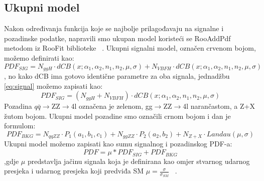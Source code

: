 \documentclass[12pt,a4paper,oneside]{article}
\begin{document}
\begin{linenumbers}
		\subsection{Ukupni model}
		Nakon određivanja funkcija koje se najbolje prilagođavaju na signalne i pozadinske podatke, napravili smo ukupan model koristeći se RooAddPdf metodom iz RooFit biblioteke ~\cite{rooaddpdf}. 
		Ukupni signalni model, označen crvenom bojom, možemo definirati kao:
		\begin{equation}\label{eq:signal}
		PDF_{SIG}=N_{ggH} \cdot dCB(x;\alpha_{1}, \alpha_{2}, n_{1}, n_{2}, \mu, \sigma) + N_{VBFH} \cdot dCB(x;\alpha_{1}, \alpha_{2}, n_{1}, n_{2}, \mu, \sigma)
		\end{equation}
		, no kako dCB ima gotovo identične parametre za oba signala, jednadžbu \ref{eq:signal} možemo zapisati kao:
		\begin{equation}
		PDF_{SIG}=(N_{ggH} + N_{VBFH}) \cdot dCB(x;\alpha_{1}, \alpha_{2}, n_{1}, n_{2}, \mu, \sigma)
		\end{equation}
		Pozadina $q\bar{q}$$\rightarrow$ZZ$\rightarrow$4l označena je zelenom, gg$\rightarrow$ZZ$\rightarrow$4l narančastom, a Z+X žutom bojom. Ukupni model pozadine smo označili crnom bojom i dan je formulom:
		\begin{equation}
		PDF_{BKG}=N_{qqZZ} \cdot P_1 (a_{1},b_{1},c_{1}) + N_{ggZZ} \cdot P_2 (a_{2},b_{2}) + N_{Z+X} \cdot Landau(\mu, \sigma)
		\end{equation}
		Ukupni model možemo zapisati kao sumu signalnog i pozadinskog PDF-a:
		\begin{equation}
		PDF=\mu * PDF_{SIG} + PDF_{BKG}
		\end{equation}
		,gdje $\mu$ predstavlja jačinu signala koja je definirana kao omjer stvarnog udarnog presjeka i udarnog presjeka koji predviđa SM \begin{math}
		\mu = \frac{\sigma}{\sigma_{SM}}
	\end{math} ~\cite{doktorat}.
		

\end{linenumbers}
\end{document}
